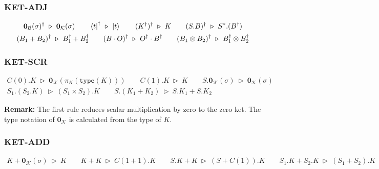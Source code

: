 \documentclass[manuscript, review, timestamp]{acmart}
\newcommand*{\type}{\texttt{type}}
\newcommand*{\reduce}{\ \triangleright\ }
\begin{document}
\subsubsection*{\textsf{KET-ADJ}}
\begin{gather*}
  \textbf{0}_\mathcal{B}(\sigma)^\dagger \reduce \textbf{0}_\mathcal{K}(\sigma)
  \qquad
  \bra{t}^\dagger \reduce \ket{t}
  \qquad
  (K^\dagger)^\dagger \reduce K
  \qquad
  (S.B)^\dagger \reduce S^*.(B^\dagger) \\
  (B_1 + B_2)^\dagger \reduce B_1^\dagger + B_2^\dagger
  \qquad
  (B \cdot O)^\dagger \reduce O^\dagger \cdot B^\dagger
  \qquad
  (B_1 \otimes B_2)^\dagger \reduce B_1^\dagger \otimes B_2^\dagger
\end{gather*}

\subsubsection*{\textsf{KET-SCR}}
\begin{gather*}
  C(0).K \reduce \textbf{0}_{\mathcal{K}}(\pi_K(\type(K)))
  \qquad
  C(1).K \reduce K
  \qquad
  S.\textbf{0}_\mathcal{K}(\sigma) \reduce \textbf{0}_\mathcal{K}(\sigma)
  \\
  S_1.(S_2.K) \reduce (S_1 \times S_2).K
  \qquad
  S.(K_1 + K_2) \reduce S.K_1 + S.K_2
\end{gather*}

\textbf{Remark: } The first rule reduces scalar multiplication by zero to the zero ket. The type notation of $\mathbf{0}_\mathcal{K}$ is calculated from the type of $K$.

\subsubsection*{\textsf{KET-ADD}}
\begin{gather*}
  K + \textbf{0}_\mathcal{K}(\sigma) \reduce K
  \qquad
  K + K \reduce C(1 + 1).K
  \qquad
  S.K + K \reduce (S + C(1)).K
  \qquad
  S_1.K + S_2.K \reduce (S_1 + S_2).K
\end{gather*}
\end{document}
